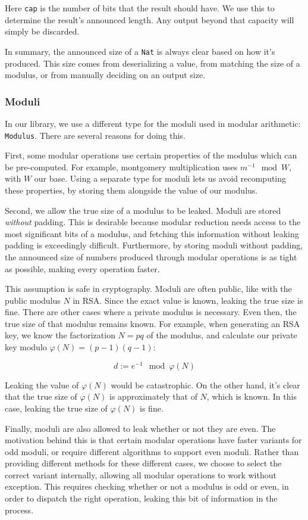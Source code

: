 \documentclass[11pt, a4paper]{article} %
\begin{document}
{Here \texttt{cap} is the number of bits that the result should have.
We use this to determine the result's announced length. Any output
beyond that capacity will simply be discarded.

In summary, the announced size of a \texttt{Nat} is always
clear based on how it's produced.
This size comes from deserializing
a value, from matching the size of a modulus, or from manually
deciding on an output size.

\subsubsection{Moduli}

In our library, we use a different type for
the moduli used in modular arithmetic: \texttt{Modulus}. There are several
reasons for doing this.

First, some modular operations use certain properties
of the modulus which can be pre-computed. For example, montgomery multiplication
uses $m^{-1} \mod W$, with $W$ our base.
Using a separate type for moduli lets us avoid
recomputing these properties, by storing them alongside
the value of our modulus.

Second, we allow the true size of a modulus to be leaked.
Moduli are stored \emph{without} padding.
This is desirable because modular reduction needs access to the most
significant bits of a modulus, and fetching this information without
leaking padding is exceedingly difficult. Furthermore,
by storing moduli without padding, the announced size of numbers produced
through modular operations is as tight as possible, making
every operation faster.

This assumption is safe in cryptography. Moduli are often public,
like with the public modulus $N$ in RSA. Since the exact value
is known, leaking the true size is fine.
There
are other cases where a private modulus is necessary.
Even then, the true size of that modulus remains known. For example,
when generating an RSA key, we know the factorization $N = pq$ of the modulus,
and calculate our private key modulo $\varphi(N) = (p - 1)(q - 1)$:

$$
d := e^{-1} \mod \varphi(N)
$$

Leaking the value of $\varphi(N)$ would be catastrophic. On the other hand,
it's clear that the true size of $\varphi(N)$ is approximately
that of $N$, which is known. In this case, leaking the true size of
$\varphi(N)$ is fine.

Finally, moduli are also allowed to leak whether or not
they are even. The motivation behind this is that certain modular
operations have faster variants for odd moduli, or require
different algorithms to support even moduli. Rather than
providing different methods for these different cases, we choose
to select the correct variant internally, allowing all modular
operations to work without exception. This requires
checking whether or not a modulus is odd or even, in order
to dispatch the right operation, leaking this bit of
information in the process.

}
\end{document}
